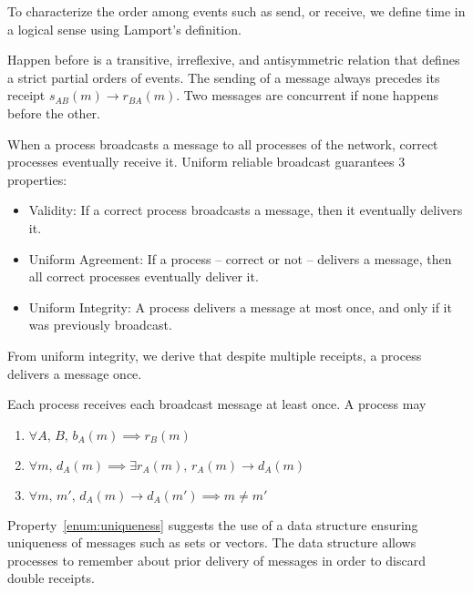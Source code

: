To characterize the order among events such as send, or receive, we define time
in a logical sense using Lamport’s definition.

\begin{definition}
  Happen before is a transitive, irreflexive, and antisymmetric relation that
  defines a strict partial orders of events. The sending of a message always
  precedes its receipt $s_{AB}(m) \rightarrow r_{BA}(m)$. Two messages are
  concurrent if none happens before the other.
\end{definition}

\begin{definition} 
  When a process broadcasts a message to all processes of the network, correct
  processes eventually receive it. Uniform reliable broadcast guarantees 3
  properties:
  \begin{itemize}[leftmargin=*]
  \item Validity: If a correct process broadcasts a message, then it
    eventually delivers it.
  \item Uniform Agreement: If a process -- correct or not -- delivers a message,
    then all correct processes eventually deliver it.
  \item Uniform Integrity: A process delivers a message at most once, and only if
    it was previously broadcast.
  \end{itemize}
\end{definition}

From uniform integrity, we derive that despite multiple receipts, a process
delivers a message once.

\begin{definition}
  Each process receives each broadcast message at least once. A process may
  \begin{enumerate}
  \item $\forall A,\,B,\, b_A(m) \implies r_B(m)$
  \item $\forall m,\, d_A(m) \implies \exists r_A(m),\, r_A(m) \rightarrow d_A(m)$
  \item \label{enum:uniqueness}
    $\forall m,\,m',\, d_A(m) \rightarrow d_A(m') \implies m \neq m'$
  \end{enumerate}
\end{definition}

Property~\ref{enum:uniqueness} suggests the use of a data structure ensuring
uniqueness of messages such as sets or vectors. The data structure allows
processes to remember about prior delivery of messages in order to discard
double receipts.

